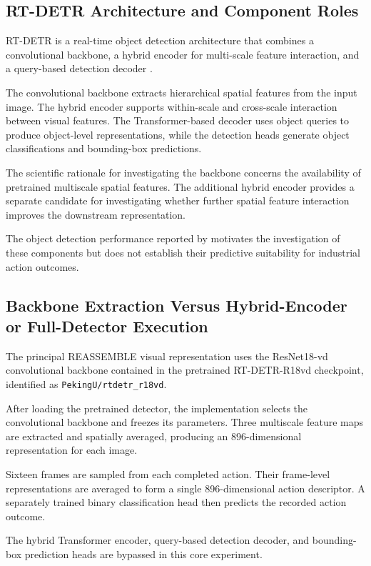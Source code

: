 \subsection{RT-DETR Architecture and Component Roles}

RT-DETR is a real-time object detection architecture that combines a convolutional backbone, a hybrid encoder for multi-scale feature interaction, and a query-based detection decoder \parencite{Zhao2024RTDETR}.

The convolutional backbone extracts hierarchical spatial features from the input image. The hybrid encoder supports within-scale and cross-scale interaction between visual features. The Transformer-based decoder uses object queries to produce object-level representations, while the detection heads generate object classifications and bounding-box predictions.

The scientific rationale for investigating the backbone concerns the availability of pretrained multiscale spatial features. The additional hybrid encoder provides a separate candidate for investigating whether further spatial feature interaction improves the downstream representation.

The object detection performance reported by \textcite{Zhao2024RTDETR} motivates the investigation of these components but does not establish their predictive suitability for industrial action outcomes.

\subsection{Backbone Extraction Versus Hybrid-Encoder or Full-Detector Execution}

The principal REASSEMBLE visual representation uses the ResNet18-vd convolutional backbone contained in the pretrained RT-DETR-R18vd checkpoint, identified as \nolinkurl{PekingU/rtdetr_r18vd}.

After loading the pretrained detector, the implementation selects the convolutional backbone and freezes its parameters. Three multiscale feature maps are extracted and spatially averaged, producing an 896-dimensional representation for each image.

Sixteen frames are sampled from each completed action. Their frame-level representations are averaged to form a single 896-dimensional action descriptor. A separately trained binary classification head then predicts the recorded action outcome.

The hybrid Transformer encoder, query-based detection decoder, and bounding-box prediction heads are bypassed in this core experiment.

